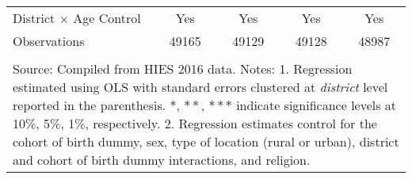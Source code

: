 \begin{table}[h!]
\begin{center}
{{\begin{tabular}{lcccc}
District $\times$ \textnormal{Age Control}	&Yes	&Yes	&Yes	&Yes\\
Observations	&49165	&49129	&49128	&48987\\
\hline
\hline\\
\multicolumn{5}{p{15cm}}{{\footnotesize Source: Compiled from HIES 2016 data.
Notes: 1. Regression estimated using OLS with standard errors clustered at \textit{district} level reported in the parenthesis. $*$, $**$, $***$ indicate significance levels at 10\%, 5\%, 1\%, respectively.
2. Regression estimates control for the cohort of birth dummy, sex, type of location (rural or urban), district and cohort of birth dummy interactions, and religion.}}.
\end{tabular}}}
\end{center}
\end{table}


